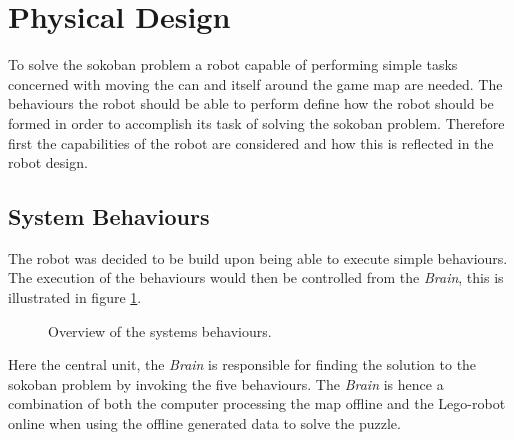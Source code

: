 \documentclass[12pt,a4paper]{article}
\begin{document}
\section{Physical Design}
To solve the sokoban problem a robot capable of performing simple tasks concerned with moving the can and itself around the game map are needed.
The behaviours the robot should be able to perform define how the robot should be formed in order to accomplish its task of solving the sokoban problem.
Therefore first the capabilities of the robot are considered and how this is reflected in the robot design.


\subsection{System Behaviours}
The robot was decided to be build upon being able to execute simple behaviours.
The execution of the behaviours would then be controlled from the \textit{Brain},
this is illustrated in figure \ref{fig:behaviourSystem}.

\begin{figure}[H]
\center
{}
\caption{Overview of the systems behaviours.}
\label{fig:behaviourSystem}
\end{figure}

Here the central unit, the \textit{Brain} is responsible for finding the solution to the sokoban problem by invoking the five behaviours.
The \textit{Brain} is hence a combination of both the computer processing the map offline and the Lego-robot online when using the offline generated data to solve the puzzle.
\end{document}
